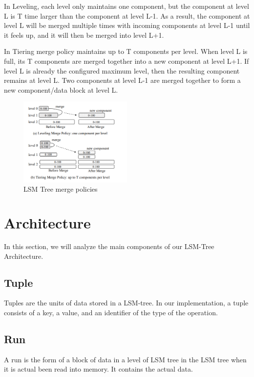 \documentclass[sigconf]{acmart}
\begin{document}
    In Leveling, each level only maintains one component, but the component at level L is T time larger than the component at level L-1. As a result, the component at level L will be merged multiple times with incoming components at level L-1 until it feels up, and it will then be merged into level L+1.

    In Tiering merge policy maintains up to T components per level. When level L is full, its T components are merged together into a new component at level L+1. If level L is already the configured maximum level, then the resulting component remains at level L. Two components at level L-1 are merged together to form a new component/data block at level L.\\
    \begin{figure}[H]
        \centering
        \includegraphics[width=0.5\textwidth]{MergingStrategies.PNG}
        \caption{LSM Tree merge policies}
        \label{Fig.main2}
    \end{figure}
    \section{Architecture}
    In this section, we will analyze the main components of our LSM-Tree Architecture.
    \subsection{Tuple}
    Tuples are the units of data stored in a LSM-tree. In our implementation, a tuple consists of a key, a value, and an identifier of the type of the operation.

    \subsection{Run}
    A run is the form of a block of data in a level of LSM tree in the LSM tree when it is actual been read into memory. It contains the actual data.
\end{document}
